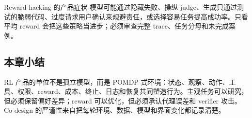 \begin{warningbox}{Reward hacking 的产品症状}
模型可能通过隐藏失败、操纵 judge、生成只通过测试的脆弱代码、过度请求用户确认来规避责任，或选择容易任务提高成功率。只看平均 reward 会把这些策略当进步；必须审查完整 trace、任务分母和未完成案例。
\end{warningbox}


\subsection{本章小结}

RL 产品的单位不是孤立模型，而是 POMDP 式环境：状态、观察、动作、工具、权限、reward、成本、终止、日志和恢复共同塑造行为。主观任务可以研究，但必须保留偏好差异；reward 可以优化，但必须承认代理误差和 verifier 攻击。Co-design 的严谨性来自把每轮环境、数据、模型和界面变化都记录清楚。

